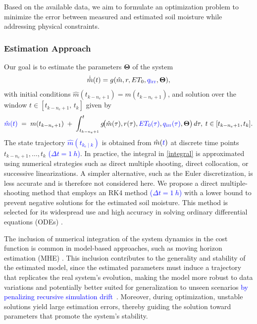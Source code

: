 \documentclass[pdflatex,sn-nature]{sn-jnl}%
\theoremstyle{thmstyleone}%
\theoremstyle{thmstyletwo}%
\theoremstyle{thmstylethree}%
\begin{document}
Based on the available data, we aim to formulate an optimization problem to minimize the error between measured and estimated soil moisture while addressing physical constraints.

\subsubsection{Estimation Approach}
Our goal is to estimate the parameters $\boldsymbol{\Theta}$ of the system 
\begin{equation}
    \dot{\hat{m}}(t) = g(\hat{m}, r, ET_0, \textcolor{blue}{q_{\mathrm{irr}}}, \boldsymbol{\Theta}),
\end{equation}
with initial conditions \(\hat{m}(t_{k-n_e+1}) = m(t_{k-n_e+1})\), and solution over the window \(t \in [t_{k-n_e+1},\, t_k]\) given by
\begin{equation}
\label{integral}
    \textcolor{blue}{\hat{m}(t)}
  \;=\;
  m(t_{k-n_e+1})\;+\;
  \int_{t_{k-n_e+1}}^{t}
        g\!\bigl(
            \hat{m}(\tau),
            r(\tau),
            \textcolor{blue}{ET_0(\tau)},
            \textcolor{blue}{q_{\mathrm{irr}}(\tau)},
            \boldsymbol{\Theta}
          \bigr)\, d\tau,
  \; t\in[t_{k-n_e+1},t_k].
\end{equation}
The state trajectory \textcolor{blue}{$ \hat{m}(t_{k_e \mid k}) $} is obtained from $ \hat{m}(\textcolor{blue}{t}) $ at discrete time points $ t_{k - n_e + 1}, \dots, t_k $ \textcolor{blue}{(\(\Delta t = \SI{1}{h}\))}. In practice, the integral in \eqref{integral} is approximated using numerical strategies such as direct multiple shooting, direct collocation, or successive linearizations. A simpler alternative, such as the Euler discretization, is less accurate and is therefore not considered here. We propose a direct multiple-shooting method that employs an RK4 method \textcolor{blue}{(\(\Delta t = \SI{1}{h}\))} with a lower bound to prevent negative solutions for the estimated soil moisture. This method is selected for its widespread use and high accuracy in solving ordinary differential equations (ODEs) \cite{rawlings2017}.

The inclusion of numerical integration of the system dynamics in the cost function is common in model-based approaches, such as moving horizon estimation (MHE) \cite{rawlings2017}\textcolor{blue}{\cite{Alessandri2017, Verhaegen2007, roffel2007process}}. This inclusion contributes to the generality and stability of the estimated model, since the estimated parameters must induce a trajectory that replicates the real system’s evolution, making the model more robust to data variations and potentially better suited for generalization to unseen scenarios \textcolor{blue}{by penalizing recursive simulation drift~\cite{Aguirre2010}}. Moreover, during optimization, unstable solutions yield large estimation errors, thereby guiding the solution toward parameters that promote the system's stability.
\end{document}
